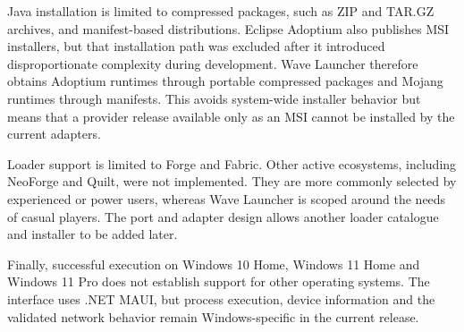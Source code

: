 Java installation is limited to compressed packages, such as ZIP and TAR.GZ archives, and manifest-based distributions. Eclipse Adoptium also publishes MSI installers, but that installation path was excluded after it introduced disproportionate complexity during development. Wave Launcher therefore obtains Adoptium runtimes through portable compressed packages and Mojang runtimes through manifests. This avoids system-wide installer behavior but means that a provider release available only as an MSI cannot be installed by the current adapters.

Loader support is limited to Forge and Fabric. Other active ecosystems, including NeoForge and Quilt, were not implemented. They are more commonly selected by experienced or power users, whereas Wave Launcher is scoped around the needs of casual players. The port and adapter design allows another loader catalogue and installer to be added later.

Finally, successful execution on Windows 10 Home, Windows 11 Home and Windows 11 Pro does not establish support for other operating systems. The interface uses .NET MAUI, but process execution, device information and the validated network behavior remain Windows-specific in the current release.
